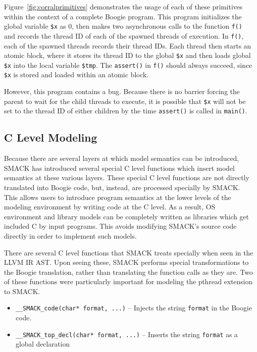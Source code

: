 Figure~\ref{fig:corralprimitives} demonstrates the usage of each of
these primitives within the context of a complete Boogie program.
This program initializes the global variable \lstinline|$x| as 0, then
makes two asynchronous calls to the function \lstinline|f()| and
records the thread ID of each of the spawned threads of execution.  In
\lstinline|f()|, each of the spawned threads records their thread IDs.
Each thread then starts an atomic block, where it stores its thread ID
to the global \lstinline|$x| and then loads global \lstinline|$x| into
the local variable \lstinline|$tmp|.  The \lstinline|assert()| in
\lstinline|f()| should always succeed, since \lstinline|$x| is stored
and loaded within an atomic block. 

However, this program contains a bug.  Because there is no barrier
forcing the parent to wait for the child threads to execute, it is
possible that \lstinline|$x| will not be set to the thread ID of
either children by the time \lstinline|assert()| is called in
\lstinline|main()|.

\subsection{C Level Modeling}\label{sec:clevelmodeling}
Because there are several layers at which model semantics can be
introduced, SMACK has introduced several special C level functions
which insert model semantics at these various layers.
These special C level functions are not directly translated into
Boogie code, but, instead, are processed specially by SMACK.  This
allows users to introduce program semantics at the lower levels of the
modeling environment by writing code at the C level.  As a result, OS
environment and library models can be completely written as libraries
which get included C by input programs.  This avoids modifying SMACK's
source code directly in order to implement such models.

There are several C level functions that SMACK treats specially when
seen in the LLVM IR AST.  Upon seeing these, SMACK performs special
transformations to the Boogie translation, rather than translating the
function calls as they are.  Two of these functions were particularly
important for modeling the pthread extension to SMACK.

\begin{itemize}
\item \lstinline|__SMACK_code(char* format, ...)| -- Injects the
  string \lstinline|format| in the Boogie code.
\item \lstinline|__SMACK_top_decl(char* format, ...)| -- Inserts the
  string \lstinline|format| as a global declaration 
\end{itemize}

